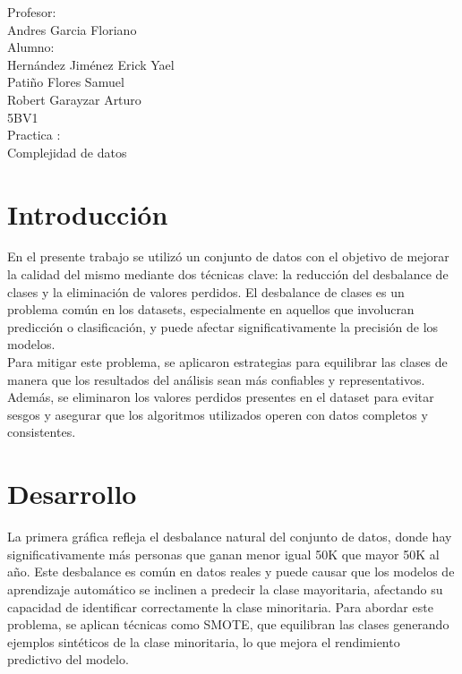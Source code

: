 \documentclass{article}
\begin{document}
\begin{titlepage}
\begin{spacing}{2}
\begin{center}
{{{                        Profesor:  \\  Andres Garcia Floriano \\
                        Alumno: \\ Hernández Jiménez Erick Yael \\ Patiño Flores Samuel \\ Robert Garayzar Arturo \\ 
                        5BV1 \\ 
                        Practica :  \\ Complejidad de datos }}}
        \end{center}
        \end{spacing}       
    \end{titlepage}
    
    \pagestyle{fancy}
    \fancyhf{}
    \fancyfoot[C]{\thepage} 
    \renewcommand{\headrulewidth}{0pt} 
    \newpage
    \tableofcontents
    \newpage
    \section{Introducción}
    En el presente trabajo se utilizó un conjunto de datos con el objetivo de mejorar la calidad del mismo mediante dos técnicas clave: la reducción del desbalance de clases y la eliminación de valores perdidos. El desbalance de clases es un problema común en los datasets, especialmente en aquellos que involucran predicción o clasificación, y puede afectar significativamente la precisión de los modelos. \\
   
    
    Para mitigar este problema, se aplicaron estrategias para equilibrar las clases de manera que los resultados del análisis sean más confiables y representativos. Además, se eliminaron los valores perdidos presentes en el dataset para evitar sesgos y asegurar que los algoritmos utilizados operen con datos completos y consistentes.
   
    \section{Desarrollo}
    
    La primera gráfica refleja el desbalance natural del conjunto de datos, donde hay significativamente más personas que ganan menor igual 50K que mayor 50K al año. Este desbalance es común en datos reales y puede causar que los modelos de aprendizaje automático se inclinen a predecir la clase mayoritaria, afectando su capacidad de identificar correctamente la clase minoritaria. Para abordar este problema, se aplican técnicas como SMOTE, que equilibran las clases generando ejemplos sintéticos de la clase minoritaria, lo que mejora el rendimiento predictivo del modelo.
    
\end{document}

